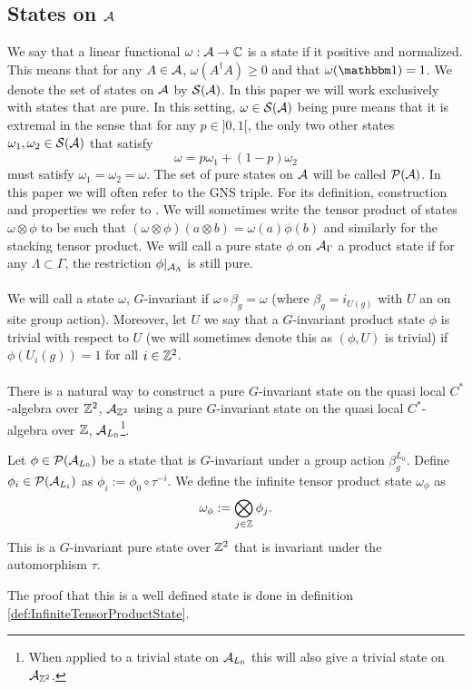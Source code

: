 \documentclass[12pt,a4paper,twoside]{article}
\numberwithin{equation}{section}
\begin{document}
\subsection{States on $\AA$}\label{sec:States}
We say that a linear functional $\omega:\AA\rightarrow \CC$ is a state if it positive and normalized. This means that for any $A\in\AA$, $\omega(A^\dagger A)\geq 0$ and that $\omega(\id)=1$. We denote the set of states on $\AA$ by $\mathcal{S}(\AA)$. In this paper we will work exclusively with states that are pure. In this setting, $\omega\in\mathcal{S}(\AA)$ being pure means that it is extremal in the sense that for any $p\in]0,1[$, the only two other states $\omega_1,\omega_2\in\mathcal{S}(\AA)$ that satisfy
\begin{equation}
	\omega=p\omega_1+(1-p)\omega_2
\end{equation}
must satisfy $\omega_1=\omega_2=\omega$. The set of pure states on $\AA$ will be called $\PP(\AA)$. In this paper we will often refer to the GNS triple. For its definition, construction and properties we refer to \cite{bratteli1979operator}. We will sometimes write the tensor product of states $\omega\otimes\phi$ to be such that $(\omega\otimes\phi)(a\otimes b)=\omega(a)\phi(b)$ and similarly for the stacking tensor product. We will call a pure state $\phi$ on $\AA_\Gamma$ a product state if for any $\Lambda\subset\Gamma$, the restriction $\phi|_{\AA_\Lambda}$ is still pure.\\\\
We will call a state $\omega$, $G$-invariant if $\omega\circ\beta_g=\omega$ (where $\beta_g=i_{U(g)}$ with $U$ an on site group action). Moreover, let $U$ we say that a $G$-invariant product state $\phi$ is trivial with respect to $U$ (we will sometimes denote this as $(\phi,U)$ is trivial) if $\phi(U_i(g))=1$ for all $i\in\ZZ^2$.\\\\
There is a natural way to construct a pure $G$-invariant state on the quasi local $C^*$-algebra over $\ZZ^2$, $\AA_{\ZZ^2}$ using a pure $G$-invariant state on the quasi local $C^*$-algebra over $\ZZ$, $\AA_{L_0}$\footnote{When applied to a trivial state on $\AA_{L_0}$ this will also give a trivial state on $\AA_{\ZZ^2}$.}.
\begin{definition}\label{def:InfiniteTensorProduct}
	Let $\phi\in\PP(\AA_{L_0})$ be a state that is $G$-invariant under a group action $\beta_g^{L_0}$. Define $\phi_i\in\PP(\AA_{L_i})$ as $\phi_i:=\phi_0\circ\tau^{-i}$. We define the infinite tensor product state $\omega_\phi$ as
	\begin{equation}
		\omega_\phi:=\bigotimes_{j\in\ZZ}\phi_j.
	\end{equation}
	This is a $G$-invariant pure state over $\ZZ^2$ that is invariant under the automorphism $\tau$.
\end{definition}
The proof that this is a well defined state is done in definition \ref{def:InfiniteTensorProductState}.
\end{document}

